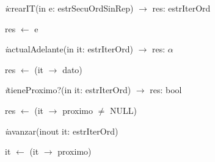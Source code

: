 \textit{i}crearIT(in e: estrSecuOrdSinRep) $\longrightarrow$ res: estrIterOrd\\
\begin{algorithm}[H]
\BlankLine
res $\leftarrow$ e
\end{algorithm}

\textit{i}actualAdelante(in it: estrIterOrd) $\longrightarrow$ res: $\alpha$\\
\begin{algorithm}[H]
\BlankLine
res $\leftarrow$ (it $\rightarrow$ dato)
\end{algorithm}

\textit{i}tieneProximo?(in it: estrIterOrd) $\longrightarrow$ res: bool\\
\begin{algorithm}[H]
\BlankLine
res $\leftarrow$ (it $\rightarrow$ proximo $\neq$ NULL)
\end{algorithm}

\textit{i}avanzar(inout it: estrIterOrd)\\
\begin{algorithm}[H]
\BlankLine
it $\leftarrow$ (it $\rightarrow$ proximo)
\end{algorithm}

